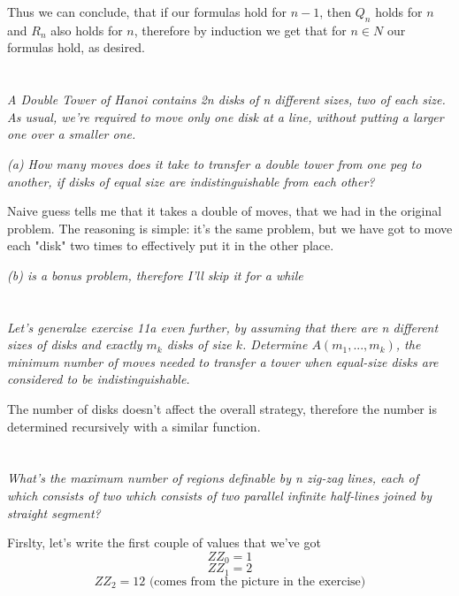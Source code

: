 \documentclass[11pt,oneside,titlepage]{book}
\begin{document}
Thus we can conclude, that if our formulas hold for $n - 1$, then $Q_n$ holds for $n$ and
$R_n$ also holds for $n$, therefore by induction we get that for $n \in N$ our formulas hold, as
desired.


\section{}

\textit{A Double Tower of Hanoi contains 2n disks of n different sizes, two of each size. As
  usual, we're required to move only one disk at a line, without putting a larger one
  over a smaller one.}

\textit{(a) How many moves does it take to transfer a double tower from one peg to
  another, if disks of equal size are indistinguishable from each other?}

Naive guess tells me that it takes a double of moves, that we had in the original problem.
The reasoning is simple: it's the same problem, but we have got to move each "disk" two times
to effectively put it in the other place.

\textit{(b) is a bonus problem, therefore I'll skip it for a while}

\section{}

\textit{Let's generalze exercise 11a even further, by assuming that there are n different
  sizes of disks and exactly $m_k$ disks of size $k$. Determine
  $A(m_1, ..., m_k)$, the minimum number of moves needed to transfer a tower when equal-size
  disks are considered to be indistinguishable.}

The number of disks doesn't affect the overall strategy, therefore the number is determined
recursively with a similar function.


\section{}

\textit{What's the maximum number of regions definable by n zig-zag lines, each of which consists
  of two which consists of two parallel infinite half-lines joined by straight segment?}


Firslty, let's write the first couple of values that we've got 
$$ZZ_0 = 1$$
$$ZZ_1 = 2$$
$$ZZ_2 = 12 \text{ (comes from the picture in the exercise)}$$
\end{document}
